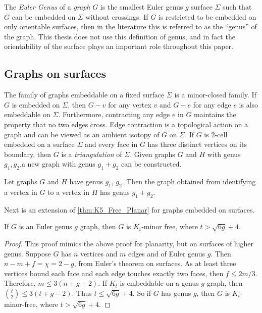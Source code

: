 The \textit{Euler Genus} of a \textit{graph} \(G\) is the smallest Euler genus \(g\) surface \(\Sigma\) such that \(G\) can be embedded on \(\Sigma\) without crossings. If $G$ is restricted to be embedded on only orientable surfaces, then in the literature this is referred to as the ``genus'' of the graph. This thesis does not use this definition of genus, and in fact the orientability of the surface plays an important role throughout this paper.


\subsection{Graphs on surfaces}
The family of graphs embeddable on a fixed surface $\Sigma$ is a minor-closed family. If $G$ is embedded on $\Sigma$, then $G - v$ for any vertex $v$ and $G - e$ for any edge $e$ is also embeddable on $\Sigma$. Furthermore, contracting any edge $e$ in $G$ maintains the property that no two edges cross. Edge contraction is a topological action on a graph and can be viewed as an ambient isotopy of $G$ on $\Sigma$. 
If $G$ is 2-cell embedded on a surface $\Sigma$ and every face in $G$ has three distinct vertices on its boundary, then $G$ is a \textit{triangulation} of $\Sigma$. Given graphs $G$ and $H$ with genus $g_1, g_2$,a new graph with genus $g_1 + g_2$ can be constructed.
\begin{theorem}\label{thm:additivity_genus}
	Let graphs $G$ and $H$ have genus $g_1$, $g_2$. Then the graph obtained from identifying a vertex in $G$ to a vertex in $H$ has genus $g_1 + g_2$. 
\end{theorem}

Next is an extension of \cref{thm:K5_Free_Planar} for graphs embedded on surfaces. 

\begin{theorem}\label{thm:bounded_genus_kt_free}
	If \(G\) is an Euler genus \(g\) graph, then \(G\) is \(K_t\)-minor free, where \(t > \sqrt{6g} + 4\). 
\end{theorem}
\begin{proof}
	This proof mimics the above proof for planarity, but on surfaces of higher genus. 
	Suppose \(G\) has \(n\) vertices and \(m\) edges and of Euler genus $g$. Then \(n - m + f = \chi = 2-g\), from Euler's theorem on surfaces. As at least three vertices bound each face and each edge touches exactly two faces, then \(f \leq 2m/3\). Therefore, \(m \leq 3(n + g - 2)\). If \(K_t\) is embeddable on a genus \(g\) graph, then \(\binom{t}{2} \leq 3 (t + g - 2)\). Thus \(t \leq \sqrt{6g} + 4\). So if $G$ has genus \(g\), then $G$ is \(K_t\)-minor-free, where \(t > \sqrt{6g} + 4\). 
\end{proof}